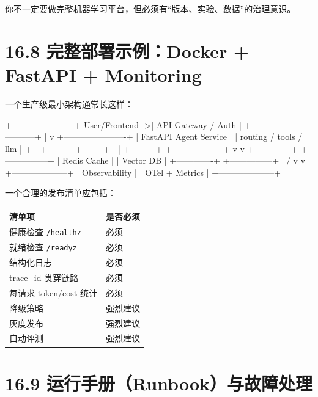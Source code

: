 你不一定要做完整机器学习平台，但必须有``版本、实验、数据''的治理意识。


\section{16.8 完整部署示例：Docker + FastAPI + Monitoring}

一个生产级最小架构通常长这样：


\begin{codeblock}
                +----------------------+
User/Frontend ->| API Gateway / Auth   |
                +----------+-----------+
                           |
                           v
                +----------------------+
                | FastAPI Agent Service |
                | routing / tools / llm |
                +---+----------+--------+
                    |          |
          +---------+          +------------------+
          v                                   v
   +-------------+                     +---------------+
   | Redis Cache |                     | Vector DB     |
   +-------------+                     +---------------+
                    \                /
                     v              v
                  +--------------------+
                  | Observability      |
                  | OTel + Metrics     |
                  +--------------------+
\end{codeblock}

一个合理的发布清单应包括：


\begingroup
\scriptsize
\setlength{\tabcolsep}{3pt}
\begin{longtable}{|p{}|p{}|}
\hline
清单项 & 是否必须 \\ \hline
健康检查 \texttt{/healthz} & 必须 \\ \hline
就绪检查 \texttt{/readyz} & 必须 \\ \hline
结构化日志 & 必须 \\ \hline
trace\_id 贯穿链路 & 必须 \\ \hline
每请求 token/cost 统计 & 必须 \\ \hline
降级策略 & 强烈建议 \\ \hline
灰度发布 & 强烈建议 \\ \hline
自动评测 & 强烈建议 \\ \hline
\end{longtable}
\endgroup

\section{16.9 运行手册（Runbook）与故障处理}

